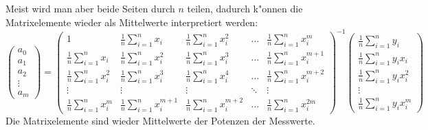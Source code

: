 Meist wird man aber beide Seiten durch $n$ teilen, dadurch k"onnen die
Matrixelemente wieder als Mittelwerte interpretiert werden:
\begin{equation}
\begin{pmatrix}
a_0\\
a_1\\
a_2\\
\vdots\\
a_m
\end{pmatrix}
=
\begin{pmatrix}
1
	&\frac1n\sum_{i=1}^nx_i
		&\frac1n\sum_{i=1}^nx_i^2
			&\dots
				&\frac1n\sum_{i=1}^nx_i^m\\
\frac1n\sum_{i=1}^nx_i
	&\frac1n\sum_{i=1}^nx_i^2
		&\frac1n\sum_{i=1}^nx_i^3
			&\dots
				&\frac1n\sum_{i=1}^nx_i^{m+1}\\
\frac1n\sum_{i=1}^nx_i^2
	&\frac1n\sum_{i=1}^nx_i^3
		&\frac1n\sum_{i=1}^nx_i^4
			&\dots
				&\frac1n\sum_{i=1}^nx_i^{m+2}\\
\vdots
	&\vdots
		&\vdots
			&\ddots
				&\vdots\\
\frac1n\sum_{i=1}^nx_i^m
	&\frac1n\sum_{i=1}^nx_i^{m+1}
		&\frac1n\sum_{i=1}^nx_i^{m+2}
			&\dots
				&\frac1n\sum_{i=1}^nx_i^{2m}
\end{pmatrix}^{-1}
\begin{pmatrix}
\frac1n\sum_{i=1}^ny_i     \\
\frac1n\sum_{i=1}^ny_ix_i  \\
\frac1n\sum_{i=1}^ny_ix_i^2\\
\vdots\\
\frac1n\sum_{i=1}^ny_ix_i^m
\end{pmatrix}
\label{polynomregression}
\end{equation}
Die Matrixelemente sind wieder Mittelwerte der Potenzen der Messwerte.

